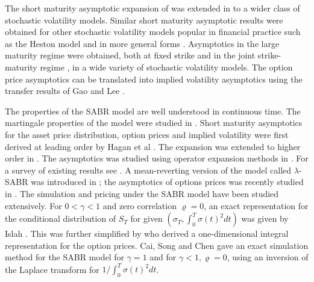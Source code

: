\documentclass[11pt]{article}
\numberwithin{equation}{section}
\theoremstyle{plain}
\begin{document}
The short maturity asymptotic expansion of \cite{SABR} was extended in
\cite{BBF,HLbook} to a wider class of stochastic volatility models. 
Similar short maturity asymptotic results were obtained for other stochastic 
volatility models popular in financial practice such as the Heston model 
\cite{FJ0,FJ2} and in more general forms \cite{HLbook,Deuschel}.
Asymptotics in the large maturity regime were obtained, both at
fixed strike \cite{Lewis,Lewis2002,Rogers,Forde1} and in the 
joint strike-maturity regime
\cite{FJ1}, in a wide variety of stochastic volatility models. 
The option price asymptotics can be translated into implied volatility 
asymptotics using the transfer results of Gao and Lee \cite{GaoLee}.


The properties of the SABR model are well understood in continuous time.
The martingale properties of the model were studied in \cite{Jourdain,LM}.
Short maturity asymptotics for the asset price distribution, option prices
and implied volatility were first derived at leading order 
by Hagan et al \cite{SABR}.  The expansion was extended to higher order in
\cite{HLbook,Paulot,Lewis2017}. 
The asymptotics was studied using operator expansion methods in \cite{CCMN}.
For a survey of existing results see \cite{SABRbook}. A mean-reverting version 
of the model called $\lambda$-SABR 
was introduced in \cite{HLbook}; the asymptotics of options prices was
recently studied in \cite{GHN}.
The simulation and pricing under the SABR model have been studied
extensively. For $0 < \gamma < 1$ and zero correlation $\varrho=0$, 
an exact representation for the conditional distribution of $S_T$ 
for given $(\sigma_T , \int_0^T \sigma(t)^2 dt)$ was given by Islah \cite{Islah}.
This was further simplified by \cite{AntonovWings} who derived a 
one-dimensional integral representation for the option prices. 
Cai, Song and Chen \cite{CaiSongChen} gave an exact 
simulation method for the SABR model for $\gamma=1$ and for 
$\gamma < 1, \varrho=0$, using an inversion of the
Laplace transform for $1/\int_0^T \sigma(t)^2 dt$.
\end{document}
